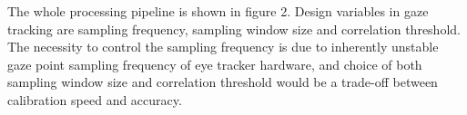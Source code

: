 \documentclass{sigchi}
\begin{document}
The whole processing pipeline is shown in figure 2. Design variables in gaze tracking are sampling frequency, sampling window size and correlation threshold. The necessity to control the sampling frequency is due to inherently unstable gaze point sampling frequency of eye tracker hardware, and choice of both sampling window size and correlation threshold would be a trade-off between calibration speed and accuracy.

\end{document}
